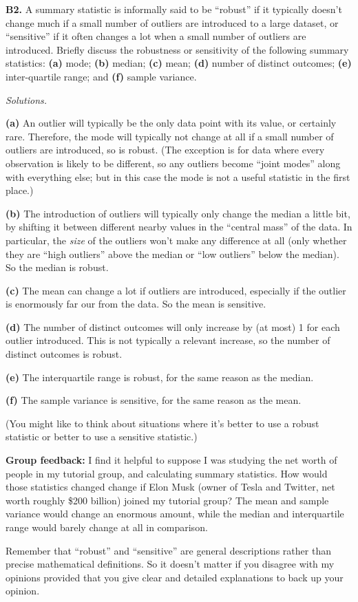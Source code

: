 \documentclass[
  a4paper,
]{book}
\theoremstyle{definition}
\theoremstyle{definition}
\theoremstyle{definition}
\theoremstyle{definition}
\theoremstyle{remark}
\begin{document}
\textbf{B2.} A summary statistic is informally said to be ``robust'' if it typically doesn't change much if a small number of outliers are introduced to a large dataset, or ``sensitive'' if it often changes a lot when a small number of outliers are introduced. Briefly discuss the robustness or sensitivity of the following summary statistics: \textbf{(a)} mode; \textbf{(b)} median; \textbf{(c)} mean; \textbf{(d)} number of distinct outcomes; \textbf{(e)} inter-quartile range; and \textbf{(f)} sample variance.

\begin{myanswers}
\emph{Solutions.}

\textbf{(a)} An outlier will typically be the only data point with its value, or certainly rare. Therefore, the mode will typically not change at all if a small number of outliers are introduced, so is robust. (The exception is for data where every observation is likely to be different, so any outliers become ``joint modes'' along with everything else; but in this case the mode is not a useful statistic in the first place.)

\textbf{(b)} The introduction of outliers will typically only change the median a little bit, by shifting it between different nearby values in the ``central mass'' of the data. In particular, the \emph{size} of the outliers won't make any difference at all (only whether they are ``high outliers'' above the median or ``low outliers'' below the median). So the median is robust.

\textbf{(c)} The mean can change a lot if outliers are introduced, especially if the outlier is enormously far our from the data. So the mean is sensitive.

\textbf{(d)} The number of distinct outcomes will only increase by (at most) 1 for each outlier introduced. This is not typically a relevant increase, so the number of distinct outcomes is robust.

\textbf{(e)} The interquartile range is robust, for the same reason as the median.

\textbf{(f)} The sample variance is sensitive, for the same reason as the mean.

(You might like to think about situations where it's better to use a robust statistic or better to use a sensitive statistic.)

\textbf{Group feedback:} I find it helpful to suppose I was studying the net worth of people in my tutorial group, and calculating summary statistics. How would those statistics changed change if Elon Musk (owner of Tesla and Twitter, net worth roughly \$200 billion) joined my tutorial group? The mean and sample variance would change an enormous amount, while the median and interquartile range would barely change at all in comparison.

Remember that ``robust'' and ``sensitive'' are general descriptions rather than precise mathematical definitions. So it doesn't matter if you disagree with my opinions provided that you give clear and detailed explanations to back up your opinion.

\end{myanswers}
\end{document}
